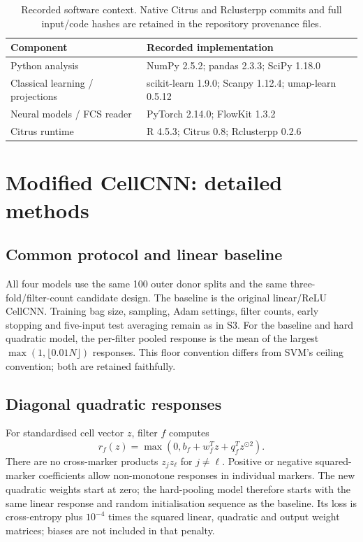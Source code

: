 \documentclass[11pt,a4paper]{article}
\begin{document}
\begin{table}[htb]\centering\small
\begin{tabular}{@{}ll@{}}\toprule
Component & Recorded implementation\\\midrule
Python analysis & NumPy 2.5.2; pandas 2.3.3; SciPy 1.18.0\\
Classical learning / projections & scikit-learn 1.9.0; Scanpy 1.12.4; umap-learn 0.5.12\\
Neural models / FCS reader & PyTorch 2.14.0; FlowKit 1.3.2\\
Citrus runtime & R 4.5.3; Citrus 0.8; Rclusterpp 0.2.6\\\bottomrule
\end{tabular}
\caption{Recorded software context. Native Citrus and Rclusterpp commits and full input/code hashes are retained in the repository provenance files.}
\end{table}

\clearpage
\section{Modified CellCNN: detailed methods}
\subsection{Common protocol and linear baseline}
All four models use the same 100 outer donor splits and the same three-fold/filter-count candidate design. The baseline is the original linear/ReLU CellCNN. Training bag size, sampling, Adam settings, filter counts, early stopping and five-input test averaging remain as in S3. For the baseline and hard quadratic model, the per-filter pooled response is the mean of the largest $\max(1,\lfloor0.01N\rfloor)$ responses. This floor convention differs from SVM's ceiling convention; both are retained faithfully.

\subsection{Diagonal quadratic responses}
For standardised cell vector $z$, filter $f$ computes
\[
r_f(z)=\max\left(0,b_f+w_f^Tz+q_f^Tz^{\odot2}\right).
\]
There are no cross-marker products $z_jz_\ell$ for $j\ne\ell$. Positive or negative squared-marker coefficients allow non-monotone responses in individual markers. The new quadratic weights start at zero; the hard-pooling model therefore starts with the same linear response and random initialisation sequence as the baseline. Its loss is cross-entropy plus $10^{-4}$ times the squared linear, quadratic and output weight matrices; biases are not included in that penalty.
\end{document}
